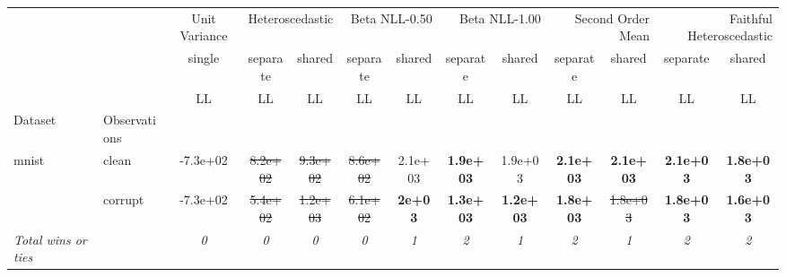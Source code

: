 \begin{tabular}{ll|c|cc|cc|cc|cc|cc}
\toprule
{} & {} & {Unit Variance} & \multicolumn{2}{r}{Heteroscedastic} & \multicolumn{2}{r}{Beta NLL-0.50} & \multicolumn{2}{r}{Beta NLL-1.00} & \multicolumn{2}{r}{Second Order Mean} & \multicolumn{2}{r}{Faithful Heteroscedastic} \\
{} & {} & {single} & {separate} & {shared} & {separate} & {shared} & {separate} & {shared} & {separate} & {shared} & {separate} & {shared} \\
{} & {} & {LL} & {LL} & {LL} & {LL} & {LL} & {LL} & {LL} & {LL} & {LL} & {LL} & {LL} \\
{Dataset} & {Observations} & {} & {} & {} & {} & {} & {} & {} & {} & {} & {} & {} \\
\midrule
\multirow[t]{2}{*}{mnist} & clean & -7.3e+02 & \sout{8.2e+02} & \sout{9.3e+02} & \sout{8.6e+02} & 2.1e+03 & \textbf{1.9e+03} & 1.9e+03 & \textbf{2.1e+03} & \textbf{2.1e+03} & \textbf{2.1e+03} & \textbf{1.8e+03} \\
 & corrupt & -7.3e+02 & \sout{5.4e+02} & \sout{1.2e+03} & \sout{6.1e+02} & \textbf{2e+03} & \textbf{1.3e+03} & \textbf{1.2e+03} & \textbf{1.8e+03} & \sout{1.8e+03} & \textbf{1.8e+03} & \textbf{1.6e+03} \\
\textit{{Total wins or ties}} &  & \textit{0} & \textit{0} & \textit{0} & \textit{0} & \textit{1} & \textit{2} & \textit{1} & \textit{2} & \textit{1} & \textit{2} & \textit{2} \\
\bottomrule
\end{tabular}
